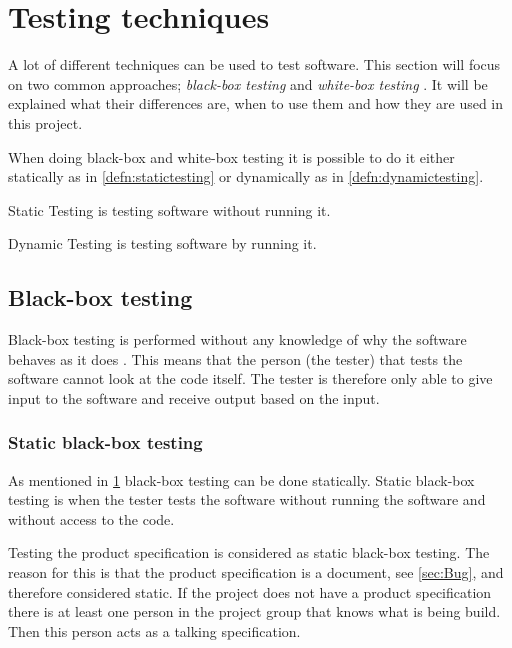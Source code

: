 \documentclass[../../master.tex]{subfiles}
\begin{document}
\section{Testing techniques} \label{sec:testingtechniques}
A lot of different techniques can be used to test software.
This section will focus on two common approaches; \textit{black-box testing} and \textit{white-box testing} \cite{SoftwareTesting}.
It will be explained what their differences are, when to use them and how they are used in this project.

When doing black-box and white-box testing it is possible to do it either statically as in \cref{defn:statictesting} or dynamically as in \cref{defn:dynamictesting}.

\begin{defn} \label{defn:statictesting}
Static Testing is testing software without running it.
\end{defn}

\begin{defn} \label{defn:dynamictesting}
Dynamic Testing is testing software by running it.
\end{defn}

\subsection{Black-box testing} \label{sec:blackboxtesting}
Black-box testing is performed without any knowledge of why the software behaves as it does \cite{SoftwareTesting}.
This means that the person (the tester) that tests the software cannot look at the code itself.
The tester is therefore only able to give input to the software and receive output based on the input.

\subsubsection{Static black-box testing}
As mentioned in \cref{sec:testingtechniques} black-box testing can be done statically.
Static black-box testing is when the tester tests the software without running the software and without access to the code.

Testing the product specification is considered as static black-box testing.
The reason for this is that the product specification is a document, see \cref{sec:Bug}, and therefore considered static.
If the project does not have a product specification there is at least one person in the project group that knows what is being build.
Then this person acts as a talking specification. \cite{SoftwareTesting}
\end{document}

